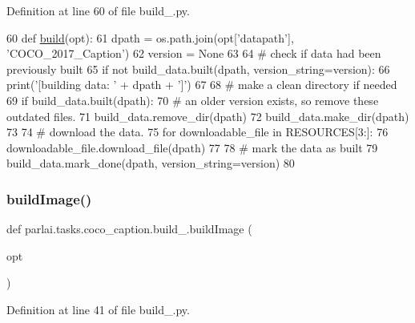 Definition at line 60 of file build\+\_.\+py.


\begin{DoxyCode}
60 \textcolor{keyword}{def }\hyperlink{namespaceparlai_1_1tasks_1_1coco__caption_1_1build__2017_a7831ed11d47deae2c049d33a4fe035c8}{build}(opt):
61     dpath = os.path.join(opt[\textcolor{stringliteral}{'datapath'}], \textcolor{stringliteral}{'COCO\_2017\_Caption'})
62     version = \textcolor{keywordtype}{None}
63 
64     \textcolor{comment}{# check if data had been previously built}
65     \textcolor{keywordflow}{if} \textcolor{keywordflow}{not} build\_data.built(dpath, version\_string=version):
66         print(\textcolor{stringliteral}{'[building data: '} + dpath + \textcolor{stringliteral}{']'})
67 
68         \textcolor{comment}{# make a clean directory if needed}
69         \textcolor{keywordflow}{if} build\_data.built(dpath):
70             \textcolor{comment}{# an older version exists, so remove these outdated files.}
71             build\_data.remove\_dir(dpath)
72         build\_data.make\_dir(dpath)
73 
74         \textcolor{comment}{# download the data.}
75         \textcolor{keywordflow}{for} downloadable\_file \textcolor{keywordflow}{in} RESOURCES[3:]:
76             downloadable\_file.download\_file(dpath)
77 
78         \textcolor{comment}{# mark the data as built}
79         build\_data.mark\_done(dpath, version\_string=version)
80 \end{DoxyCode}
\mbox{\label{namespaceparlai_1_1tasks_1_1coco__caption_1_1build__2017_ae85e762d86aa89bda50b2f9b6df4f112}} 
\subsubsection{\texorpdfstring{build\+Image()}{buildImage()}}
{\footnotesize\ttfamily def parlai.\+tasks.\+coco\+\_\+caption.\+build\+\_.\+build\+Image (\begin{DoxyParamCaption}\item[{}]{opt }\end{DoxyParamCaption})}



Definition at line 41 of file build\+\_.\+py.



